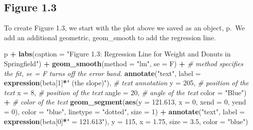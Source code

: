\documentclass[]{book}
\newenvironment{Shaded}{\begin{snugshade}}{\end{snugshade}}
\newcommand{\CommentTok}[1]{\textcolor[rgb]{0.56,0.35,0.01}{\textit{#1}}}
\newcommand{\DataTypeTok}[1]{\textcolor[rgb]{0.13,0.29,0.53}{#1}}
\newcommand{\DecValTok}[1]{\textcolor[rgb]{0.00,0.00,0.81}{#1}}
\newcommand{\FloatTok}[1]{\textcolor[rgb]{0.00,0.00,0.81}{#1}}
\newcommand{\KeywordTok}[1]{\textcolor[rgb]{0.13,0.29,0.53}{\textbf{#1}}}
\newcommand{\NormalTok}[1]{#1}
\newcommand{\OperatorTok}[1]{\textcolor[rgb]{0.81,0.36,0.00}{\textbf{#1}}}
\newcommand{\StringTok}[1]{\textcolor[rgb]{0.31,0.60,0.02}{#1}}
\begin{document}
\hypertarget{figure-1.3}{%
\subsection{Figure 1.3}\label{figure-1.3}}

To create Figure 1.3, we start with the plot above we saved as an object, p.~We add an additional geometric, geom\_smooth to add the regression line.

\begin{Shaded}
\begin{Highlighting}[]
\NormalTok{p }\OperatorTok{+}\StringTok{ }\KeywordTok{labs}\NormalTok{(}\DataTypeTok{caption =} \StringTok{"Figure 1.3: Regression Line for Weight and Donuts in Springfield"}\NormalTok{) }\OperatorTok{+}\StringTok{ }
\StringTok{  }\KeywordTok{geom_smooth}\NormalTok{(}\DataTypeTok{method =} \StringTok{"lm"}\NormalTok{, }\DataTypeTok{se =}\NormalTok{ F) }\OperatorTok{+}\StringTok{ }\CommentTok{# method specifies the fit,  se = F turns off the error band.}
\StringTok{  }\KeywordTok{annotate}\NormalTok{(}\StringTok{"text"}\NormalTok{, }\DataTypeTok{label =} \KeywordTok{expression}\NormalTok{(beta[}\DecValTok{1}\NormalTok{]}\OperatorTok{*}\StringTok{" (the slope)"}\NormalTok{), }\CommentTok{# text annotation}
           \DataTypeTok{y =} \DecValTok{205}\NormalTok{, }\CommentTok{# position of the text}
           \DataTypeTok{x =} \DecValTok{8}\NormalTok{,   }\CommentTok{# position of the text}
           \DataTypeTok{angle =} \DecValTok{20}\NormalTok{, }\CommentTok{# angle of the text}
           \DataTypeTok{color =} \StringTok{"Blue"}\NormalTok{) }\OperatorTok{+}\StringTok{ }\CommentTok{# color of the text}
\StringTok{  }\KeywordTok{geom_segment}\NormalTok{(}\KeywordTok{aes}\NormalTok{(}\DataTypeTok{y =} \FloatTok{121.613}\NormalTok{, }\DataTypeTok{x =} \DecValTok{0}\NormalTok{, }\DataTypeTok{xend =} \DecValTok{0}\NormalTok{, }\DataTypeTok{yend =} \DecValTok{0}\NormalTok{),}
               \DataTypeTok{color =} \StringTok{"blue"}\NormalTok{,}
               \DataTypeTok{linetype =} \StringTok{"dotted"}\NormalTok{,}
               \DataTypeTok{size =} \DecValTok{1}\NormalTok{) }\OperatorTok{+}\StringTok{ }
\StringTok{  }\KeywordTok{annotate}\NormalTok{(}\StringTok{"text"}\NormalTok{, }\DataTypeTok{label =} \KeywordTok{expression}\NormalTok{(beta[}\DecValTok{0}\NormalTok{]}\OperatorTok{*}\StringTok{" = 121.613"}\NormalTok{),}
           \DataTypeTok{y =} \DecValTok{115}\NormalTok{, }\DataTypeTok{x =} \FloatTok{1.75}\NormalTok{, }\DataTypeTok{size =} \FloatTok{3.5}\NormalTok{, }\DataTypeTok{color =} \StringTok{"blue"}\NormalTok{)}
\end{Highlighting}
\end{Shaded}
\end{document}
